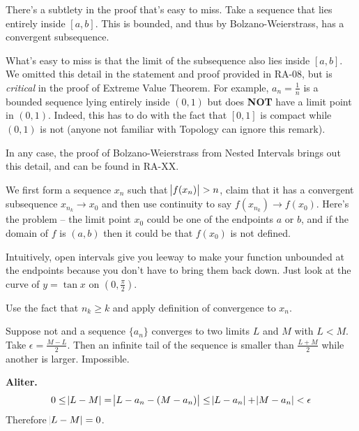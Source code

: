 There's a subtlety in the proof that's easy to miss. Take a sequence that lies entirely inside $[a, b]$. This is bounded, and thus by Bolzano-Weierstrass, has a convergent subsequence.

What's easy to miss is that the limit of the subsequence also lies inside $[a, b]$. We omitted this detail in the statement and proof provided in RA-08, but is \emph{critical} in the proof of Extreme Value Theorem. For example, $a_n = \frac 1 n$ is a bounded sequence lying entirely inside $(0, 1)$ but does \textbf{NOT} have a limit point in $(0, 1)$. Indeed, this has to do with the fact that $[0, 1]$ is compact while $(0, 1)$ is not (anyone not familiar with Topology can ignore this remark).

In any case, the proof of Bolzano-Weierstrass from Nested Intervals brings out this detail, and can be found in RA-XX.

\AnswerSection
\ans We first form a sequence $x_n$ such that $\abs{f(x_n)} > n$, claim that it has a convergent subsequence $x_{n_k} \rightarrow x_0$ and then use continuity to say $f(x_{n_k}) \rightarrow f(x_0)$. Here's the problem -- the limit point $x_0$ could be one of the endpoints $a$ or $b$, and if the domain of $f$ is $(a, b)$ then it could be that $f(x_0)$ is not defined.

Intuitively, open intervals give you leeway to make your function unbounded at the endpoints because you don't have to bring them back down. Just look at the curve of $y = \tan x$ on $(0, \frac \pi 2)$.

\ans Use the fact that $n_k \geq k$ and apply definition of convergence to $x_n$.

\ans Suppose not and a sequence $\{a_n\}$ converges to two limits $L$ and $M$ with $L < M$. Take $\epsilon = \frac{M - L}{2}$. Then an infinite tail of the sequence is smaller than $\frac{L + M}{2}$ while another is larger. Impossible.

\textbf{Aliter.} $$0 \leq \abs{L - M} = \abs{L - a_n - (M - a_n)} \leq \abs{L - a_n} + \abs{M - a_n} < \epsilon$$
Therefore $\abs{L - M} = 0$.
